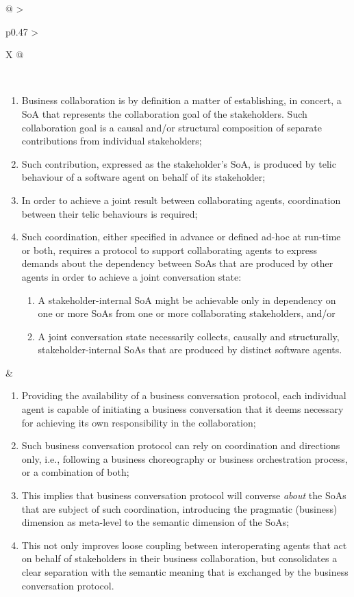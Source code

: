 \begin{xltabular}[l]{\linewidth}{@{} >{\small\raggedright\arraybackslash}p{0.47\linewidth} >{\small\raggedright\arraybackslash}X @{}}
\begin{description}[labelwidth=3.7cm,leftmargin=3.7cm+1ex,nosep,topsep=2ex,labelsep=1ex,font=\bfseries]
\end{description} \\
\begin{enumerate}[left=6pt, nosep]
  \item Business collaboration is by definition a matter of establishing, in concert, a SoA that represents the collaboration goal of the stakeholders. Such collaboration goal is a causal and/or structural composition of separate contributions from individual stakeholders;
  \item Such contribution, expressed as the stakeholder's SoA, is produced by telic behaviour of a software agent on behalf of its stakeholder;
  \item In order to achieve a joint result between collaborating agents, coordination between their telic behaviours is required;
  \item Such coordination, either specified in advance or defined ad-hoc at run-time or both, requires a protocol to support collaborating agents to express demands about the dependency between SoAs that are produced by other agents in order to achieve a joint conversation state:
  \begin{enumerate}
    \item A stakeholder-internal SoA might be achievable only in dependency on one or more SoAs from one or more collaborating stakeholders, and/or
    \item A joint conversation state necessarily collects, causally and structurally, stakeholder-internal SoAs that are produced by distinct software agents.
  \end{enumerate}
\end{enumerate}
&
\begin{enumerate}[left=10pt, nosep]
  \item Providing the availability of a business conversation protocol, each individual agent is capable of initiating a business conversation that it deems necessary for achieving its own responsibility in the collaboration;
  \item Such business conversation protocol can rely on coordination and directions only, i.e., following a business choreography or business orchestration process, or a combination of both;
  \item This implies that business conversation protocol will converse \emph{about} the SoAs that are subject of such coordination, introducing the pragmatic (business) dimension as meta-level to the semantic dimension of the SoAs;
  \item This not only improves loose coupling between interoperating agents that act on behalf of stakeholders in their business collaboration, but consolidates a clear separation with the semantic meaning that is exchanged by the business conversation protocol.

\end{enumerate}
\end{xltabular}
